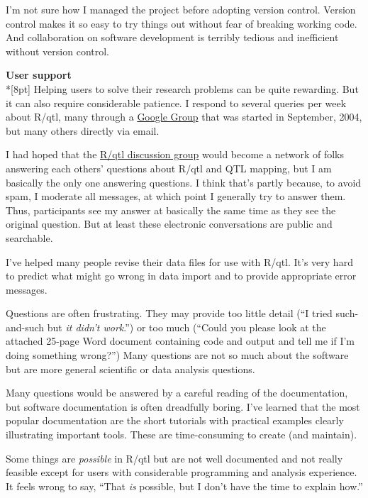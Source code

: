 \documentclass[letterpaper]{article}
\begin{document}
\begin{multicols}{2}
I'm not sure how I managed the project before adopting version
control. Version control makes it so easy to try things out without
fear of breaking working code. And collaboration on software development is
terribly tedious and inefficient without version control.


\bigskip
{}
\noindent \textbf{\sffamily User support}\\*[8pt]
Helping users to solve their research problems can be quite rewarding.
But it can also require considerable patience. I respond to several queries per
week about R/qtl, many through a
\href{http://groups.google.com/group/Rqtl-disc}{Google Group} that was
started in September, 2004, but many others directly via email.

I had hoped that the
\href{http://groups.google.com/group/Rqtl-disc}{R/qtl discussion
group} would become a network of folks answering each others'
questions about R/qtl and QTL mapping, but I am basically the only one
answering questions. I think that's partly because, to avoid spam, I
moderate all messages, at which point I generally try to answer
them. Thus, participants see my answer at basically the same time as
they see the original question. But at least these electronic
conversations are public and searchable.

I've helped many people revise their data files for use with R/qtl.
It's very hard to predict what might go wrong in data import and to
provide appropriate error messages.

Questions are often frustrating. They may provide too little detail
(``I tried such-and-such but \emph{it didn't work}.'') or too much
(``Could you please look at the attached 25-page Word document
containing code and output and tell me if I'm doing something wrong?'')
Many questions are not so much about the software but are more general
scientific or data analysis questions.

Many questions would be answered by a careful reading of
the documentation, but software documentation is often dreadfully
boring. I've learned that the most popular documentation are the short
tutorials with practical examples clearly illustrating important
tools. These are time-consuming to create (and maintain).

Some things are \emph{possible\/} in R/qtl but are not well documented
and not really feasible except for users with considerable programming
and analysis experience. It feels wrong to say, ``That \emph{is\/}
possible, but I don't have the time to explain how.''


\end{multicols}
\end{document}
